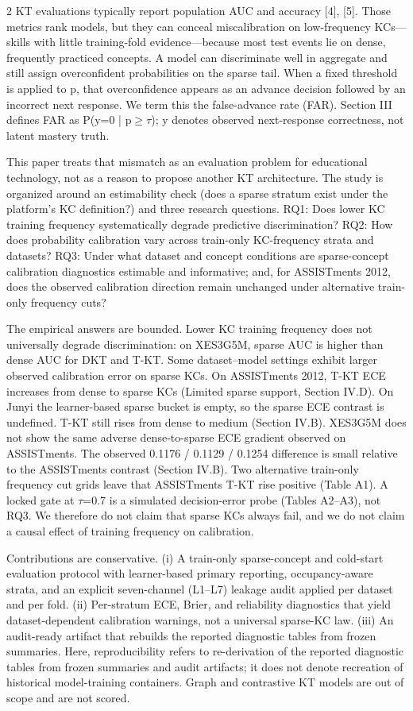 \documentclass[10pt,a4paper]{article}
\begin{document}
\begin{multicols}{2}
KT evaluations typically report population AUC and accuracy [4], [5]. Those metrics rank models, but they can conceal miscalibration on low-frequency KCs---skills with little training-fold evidence---because most test events lie on dense, frequently practiced concepts. A model can discriminate well in aggregate and still assign overconfident probabilities on the sparse tail. When a fixed threshold is applied to p, that overconfidence appears as an advance decision followed by an incorrect next response. We term this the false-advance rate (FAR). Section III defines FAR as P(y=0 | p$\geq$$\tau$); y denotes observed next-response correctness, not latent mastery truth.

 This paper treats that mismatch as an evaluation problem for educational technology, not as a reason to propose another KT architecture. The study is organized around an estimability check (does a sparse stratum exist under the platform's KC definition?) and three research questions. RQ1: Does lower KC training frequency systematically degrade predictive discrimination? RQ2: How does probability calibration vary across train-only KC-frequency strata and datasets? RQ3: Under what dataset and concept conditions are sparse-concept calibration diagnostics estimable and informative; and, for ASSISTments 2012, does the observed calibration direction remain unchanged under alternative train-only frequency cuts?

 The empirical answers are bounded. Lower KC training frequency does not universally degrade discrimination: on XES3G5M, sparse AUC is higher than dense AUC for DKT and T-KT. Some dataset--model settings exhibit larger observed calibration error on sparse KCs. On ASSISTments 2012, T-KT ECE increases from dense to sparse KCs (Limited sparse support, Section IV.D). On Junyi the learner-based sparse bucket is empty, so the sparse ECE contrast is undefined. T-KT still rises from dense to medium (Section IV.B). XES3G5M does not show the same adverse dense-to-sparse ECE gradient observed on ASSISTments. The observed 0.1176 / 0.1129 / 0.1254 difference is small relative to the ASSISTments contrast (Section IV.B). Two alternative train-only frequency cut grids leave that ASSISTments T-KT rise positive (Table A1). A locked gate at $\tau$=0.7 is a simulated decision-error probe (Tables A2--A3), not RQ3. We therefore do not claim that sparse KCs always fail, and we do not claim a causal effect of training frequency on calibration.

Contributions are conservative. (i) A train-only sparse-concept and cold-start evaluation protocol with learner-based primary reporting, occupancy-aware strata, and an explicit seven-channel (L1--L7) leakage audit applied per dataset and per fold. (ii) Per-stratum ECE, Brier, and reliability diagnostics that yield dataset-dependent calibration warnings, not a universal sparse-KC law. (iii) An audit-ready artifact that rebuilds the reported diagnostic tables from frozen summaries. Here, reproducibility refers to re-derivation of the reported diagnostic tables from frozen summaries and audit artifacts; it does not denote recreation of historical model-training containers. Graph and contrastive KT models are out of scope and are not scored.


\end{multicols}
\end{document}
